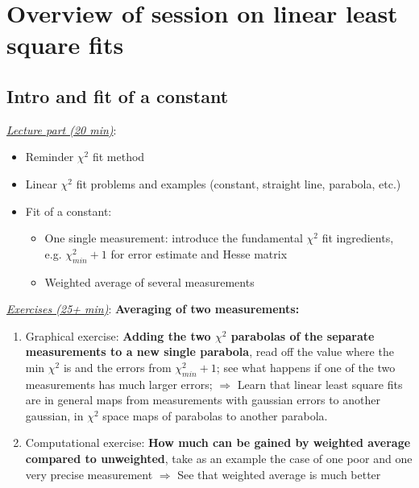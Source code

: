 \documentclass[12pt]{article}
\begin{document}
%
\section{Overview of session on linear least square fits}
\subsection{Intro and fit
of a constant} 
{\em \underline{Lecture part (20 min)}}:
\begin{itemize}
\item
Reminder $\chi^2$ fit method
\item 
Linear $\chi^2$ fit problems and examples (constant, straight line,
parabola, etc.)
\item
Fit of a constant:
\begin{itemize}
\item 
One single measurement: introduce the
fundamental $\chi^2$ fit ingredients, e.g.
$\chi^2_{min}+1$ for error estimate and Hesse matrix
\item
Weighted average of several measurements
\end{itemize}
\end{itemize}
%
{\em \underline{Exercises (25+ min)}}:
{\bf Averaging of two measurements:}
\begin{enumerate}
\item
Graphical exercise:
{\bf Adding the two $\chi^2$ parabolas of the separate measurements to
a new single parabola}, read off the value where the min $\chi^2$ is
and the errors from $\chi^2_{min}+1$;
see what happens if one of the two measurements has much larger
errors; $\Rightarrow$ Learn that linear least square fits are
in general maps from measurements with gaussian errors to another
gaussian, in $\chi^2$ space maps of parabolas to another parabola.
\item
Computational exercise:
{\bf How much can be gained by weighted average compared to unweighted},
take as an example the case of one poor and one very precise
measurement $\Rightarrow$ See that weighted average is much better
%
\end{enumerate}
%
%
\newpage
\end{document}
